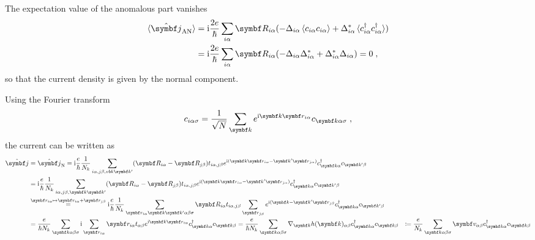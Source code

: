 \documentclass[../notes.tex]{subfiles}
\begin{document}
The expectation value of the anomalous part vanishes
\begin{align}
	\braket{\ope{\vb{j}}_{\mathrm{AN}}} &= \iu \frac{2 e}{\hbar} \sum_{i\alpha} \vb{R}_{i \alpha} (-\Delta_{i \alpha} \braket{c_{i \alpha} c_{i \alpha}} + \Delta_{i \alpha}^* \braket{c_{i \alpha}^{\dagger} c_{i \alpha}^{\dagger}}) \\
	&= \iu \frac{2 e}{\hbar} \sum_{i\alpha} \vb{R}_{i \alpha} (-\Delta_{i \alpha} \Delta_{i \alpha}^* + \Delta_{i \alpha}^* \Delta_{i \alpha}) = 0 \;,
\end{align}
so that the current density is given by the normal component.

Using the Fourier transform
\begin{equation}
	c_{i \alpha \sigma} = \frac{1}{\sqrt{N}} \sum_{\vb{k}} e^{\iu \vb{k} \vb{r}_{i \alpha}} c_{\vb{k} \alpha \sigma} \;,
\end{equation}
the current can be written as
\begin{align}
	\ope{\vb{j}} &= \ope{\vb{j}}_{\mathrm{N}} = \iu \frac{e}{\hbar} \frac{1}{N_k} \sum_{i\alpha, j\beta, vb{k} \vb{k}^{\prime}} (\vb{R}_{i \alpha} - \vb{R}_{j \beta}) t_{i \alpha, j \beta} e^{\iu (\vb{k} \vb{r}_{i \alpha} - \vb{k}^{\prime} \vb{r}_{j \alpha})} c_{\vb{k} \alpha}^{\dagger} c_{\vb{k}^{\prime} \beta} \\
	&= \iu \frac{e}{\hbar} \frac{1}{N_k} \sum_{i\alpha, j\beta, \vb{k} \vb{k}^{\prime}} (\vb{R}_{i \alpha} - \vb{R}_{j \beta}) t_{i \alpha, j \beta} e^{\iu (\vb{k} \vb{r}_{i \alpha} - \vb{k}^{\prime} \vb{r}_{j \alpha})} c_{\vb{k} \alpha}^{\dagger} c_{\vb{k}^{\prime} \beta} \\
	&\overset{\vb{r}_{i \alpha} \mapsto \vb{r}_{i \alpha} + \vb{r}_{j \beta}}{=} \iu \frac{e}{\hbar} \frac{1}{N_k} \sum_{\vb{r}_{i \alpha} \vb{k} \vb{k}^{\prime} \alpha \beta \sigma} \vb{R}_{i \alpha} t_{i \alpha, j \beta} \sum_{\vb{r}_{j \beta}} e^{\iu (\vb{k} - \vb{k}^{\prime} \vb{r}_{j \beta}} c_{\vb{k} \alpha}^{\dagger} c_{\vb{k}^{\prime} \beta} \\
	&= \frac{e}{\hbar N_k} \sum_{\vb{k} \alpha \beta \sigma} \iu \sum_{\vb{r}_{i \alpha}} \vb{r}_{i \alpha} t_{\alpha \beta} e^{\iu \vb{k} \vb{r}_{i \alpha}} c_{\vb{k} \alpha}^{\dagger} c_{\vb{k} \beta} = \frac{e}{\hbar N_k} \sum_{\vb{k} \alpha \beta \sigma} \nabla_{\vb{k}} h(\vb{k})_{\alpha \beta} c_{\vb{k} \alpha}^{\dagger} c_{\vb{k} \beta}
	&\coloneq \frac{e}{N_k} \sum_{\vb{k} \alpha \beta \sigma} \vb{v}_{\alpha \beta} c_{\vb{k} \alpha}^{\dagger} c_{\vb{k} \beta}
\end{align}
\end{document}
